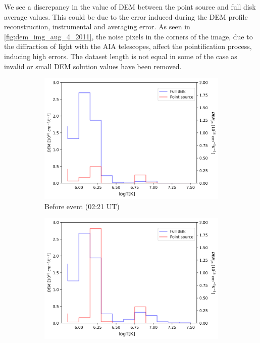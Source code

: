 \label{para:dem_discrepancy}
We see a discrepancy in the value of DEM between the point source and full disk average values. This could be due to the error induced during the DEM profile reconstruction, instrumental and averaging error. As seen in \cref{fig:dem_img_aug_4_2011}, the noise pixels in the corners of the image, due to the diffraction of light with the AIA telescopes, affect the pointification process, inducing high errors. The dataset length is not equal in some of the case as invalid or small DEM solution values have been removed.\\

\begin{figure}[h!]

    \begin{subfigure}[b]{0.3\textwidth}
        \centering
        \includegraphics[width=\textwidth]{images/dem_profile_before_event_2011_aug_04.png}
        \caption{Before event (02:21 UT)}
    \end{subfigure}
    \hfill
    \begin{subfigure}[b]{0.3\textwidth}
        \centering
        \includegraphics[width=\textwidth]{images/dem_profile_during_event_2011_aug_04.png}

\end{subfigure}
\end{figure}
